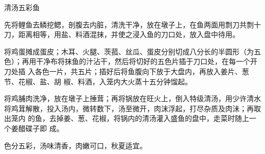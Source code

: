 %
%
%
%
%
%
%
\begin{recipe}[麒麟鱼]{清汤五彩鱼}

\ingredients


\preparation

\step 先将鲤鱼去鳞挖鳃，剖腹去内脏，清洗干净，放在墩子上，在鱼两面用剽刀共剽十
刀，距离相等，用盐、料酒混抹，并使之浸入鱼的刀口处，放入盘中待用。

\step 将鸡蛋摊成蛋皮；木耳、火腿、茨菰、丝瓜、蛋皮分别切成八分长的半圆形（为五
色）；再用干净布将抹鱼的汁沾干，然后将切好的五色片插于刀口处，在每一个开刀处插
入各色一片，共五片；插好后将鱼腹向下放于大盘内，再放入姜片、葱节、花椒、盐、胡
椒、料酒，入笼内大火蒸十五分钟馏起。

\step 将鸡脯肉洗净，放在墩子上捶茸；再将锅放在旺火上，倒入特级清汤，用少许清水
将鸡茸解散，投入汤内，微转数下，汤至微开，肉沫浮起，打尽杂质及肉沬；再取出笼内
的鱼，去掉姜、葱、花椒，将锅内的清汤灌入盛鱼的盘中，走菜时随上一个姜醋碟子即
成。

\features

色分五彩，汤味清香，肉嫩可口，秋夏适宜。

\end{recipe}


